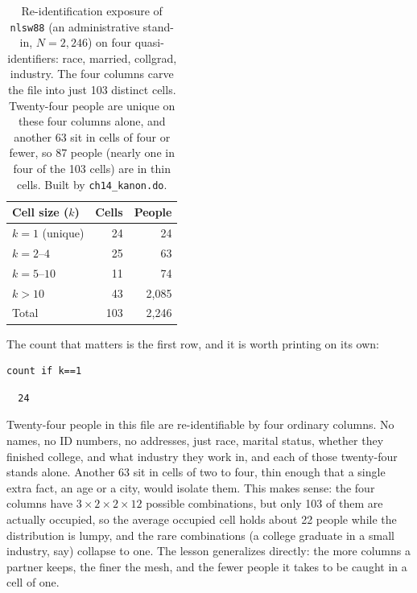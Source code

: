 \documentclass[
    a4paper,
    fontsize=10pt,
    twoside=true,
    numbers=noenddot,
]{kaobook}
\begin{document}
\begin{table}[htbp]
\centering
{\footnotesize
\begin{tabular}{lrr}
\hline
Cell size ($k$) & Cells & People \\
\hline
$k=1$ (unique)   &  24 &    24 \\
$k=2$--$4$        &  25 &    63 \\
$k=5$--$10$       &  11 &    74 \\
$k>10$            &  43 & 2{,}085 \\
\hline
Total            & 103 & 2{,}246 \\
\hline
\end{tabular}
}
\caption[$k$-anonymity of four ordinary columns]{Re-identification exposure of \texttt{nlsw88} (an administrative stand-in, $N=2{,}246$) on four quasi-identifiers: race, married, collgrad, industry. The four columns carve the file into just 103 distinct cells. Twenty-four people are unique on these four columns alone, and another 63 sit in cells of four or fewer, so 87 people (nearly one in four of the 103 cells) are in thin cells. Built by \texttt{ch14\_kanon.do}.}
\label{tab:kanon}
\end{table}

The count that matters is the first row, and it is worth printing on its own:
{\footnotesize
\begin{verbatim}
count if k==1
\end{verbatim}
}
{\footnotesize
\begin{verbatim}
  24
\end{verbatim}
}
Twenty-four people in this file are re-identifiable by four ordinary columns. No names, no ID numbers, no addresses, just race, marital status, whether they finished college, and what industry they work in, and each of those twenty-four stands alone. Another 63 sit in cells of two to four, thin enough that a single extra fact, an age or a city, would isolate them. This makes sense: the four columns have $3\times2\times2\times12$ possible combinations, but only 103 of them are actually occupied, so the average occupied cell holds about 22 people while the distribution is lumpy, and the rare combinations (a college graduate in a small industry, say) collapse to one. The lesson generalizes directly: the more columns a partner keeps, the finer the mesh, and the fewer people it takes to be caught in a cell of one.
\end{document}
